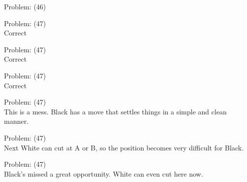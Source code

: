 \documentclass[11pt]{article}
\begin{document}
\begin{minipage}[t]{0.5\textwidth}
  {\centering
  
  Problem: (46)\\
  
  }
\end{minipage}
\begin{minipage}[t]{0.5\textwidth}
  {\centering
  
  Problem: (47)\\
  Correct\\
  }
\end{minipage}
\begin{minipage}[t]{0.5\textwidth}
  {\centering
  
  Problem: (47)\\
  Correct\\
  }
\end{minipage}
\begin{minipage}[t]{0.5\textwidth}
  {\centering
  
  Problem: (47)\\
  Correct\\
  }
\end{minipage}
\begin{minipage}[t]{0.5\textwidth}
  {\centering
  
  Problem: (47)\\
  This is a mess. Black has a move that settles things in a simple and clean manner.\\
  }
\end{minipage}
\begin{minipage}[t]{0.5\textwidth}
  {\centering
  
  Problem: (47)\\
  Next White can cut at A or B, so the position becomes very difficult for Black.\\
  }
\end{minipage}
\begin{minipage}[t]{0.5\textwidth}
  {\centering
  
  Problem: (47)\\
  Black's missed a great opportunity. White can even cut here now.\\
  }
\end{minipage}
\end{document}
